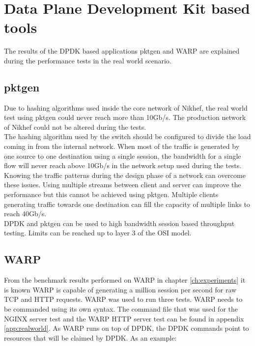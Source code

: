\section{Data Plane Development Kit based tools}
The results of the DPDK based applications pktgen and WARP are explained during the performance tests in the real world scenario.
 
\subsection{pktgen}
Due to hashing algorithms used inside the core network of Nikhef, the real world test using pktgen could never reach more than 10Gb/s. 
The production network of Nikhef could not be altered during the tests. \\ 

The hashing algorithm used by the switch should be configured to divide the load coming in from the internal network. 
When most of the traffic is generated by one source to one destination using a single session, the bandwidth for a single flow will never reach above 10Gb/s in the network setup used during the tests.
Knowing the traffic patterns during the design phase of a network can overcome these issues.
Using multiple streams between client and server can improve the performance but this cannot be achieved using pktgen.
Multiple clients generating traffic towards one destination can fill the capacity of multiple links to reach 40Gb/s. \\

DPDK and pktgen can be used to high bandwidth session based throughput testing. Limits can be reached up to layer 3 of the OSI model.


\subsection{WARP}
From the benchmark results performed on WARP in chapter \ref{ch:experiments} it is known WARP is capable of generating a million session per second for raw TCP and HTTP requests. 
WARP was used to run three tests. WARP needs to be commanded using its own syntax. The command file that was used for the NGINX server test and the WARP HTTP server test can be found in appendix \ref{app:realworld}. As WARP runs on top of DPDK, the DPDK commands point to resources that will be claimed by DPDK. As an example:

